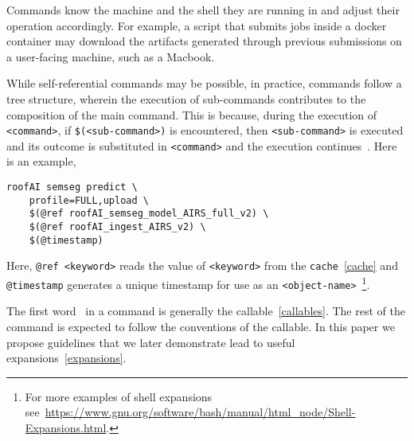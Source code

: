 Commands know the machine and the shell they are running in and adjust their operation accordingly. For example, a script that submits jobs inside a docker container may download the artifacts generated through previous submissions on a user-facing machine, such as a Macbook. 

While self-referential commands may be possible, in practice, commands follow a tree structure, wherein the execution of sub-commands contributes to the composition of the main command. This is because, during the execution of \texttt{<command>}, if \texttt{\$(<sub-command>)} is encountered, then \texttt{<sub-command>} is executed and its outcome is substituted in \texttt{<command>} and the execution continues~. Here is an example,
%
\begin{verbatim}
roofAI semseg predict \
    profile=FULL,upload \
    $(@ref roofAI_semseg_model_AIRS_full_v2) \
    $(@ref roofAI_ingest_AIRS_v2) \
    $(@timestamp)
\end{verbatim}
%
Here, \texttt{@ref <keyword>} reads the value of \texttt{<keyword>} from the \texttt{cache}~\ref{cache} and \texttt{@timestamp} generates a unique timestamp for use as an \texttt{<object-name>}~\footnote{For more examples of shell expansions see~\url{https://www.gnu.org/software/bash/manual/html\_node/Shell-Expansions.html}.}.

The first word~ in a command is generally the callable~\ref{callables}. The rest of the command is expected to follow the conventions of the callable. In this paper we propose guidelines that we later demonstrate lead to useful expansions~\ref{expansions}.



